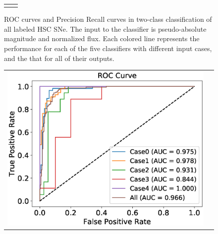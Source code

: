 \documentclass[useamsfonts]{pasj01}
\begin{document}
\begin{figure}[htbp]
\begin{tabular}{cc}
\begin{minipage}{0.5\hsize}
\begin{center}
            \end{center}
        \end{minipage}
    \end{tabular}
    \vspace{2mm}
    \caption{%
    ROC curves and Precision Recall curves in two-class classification of all labeled HSC SNe.
    The input to the classifier is pseudo-absolute magnitude and normalized flux.
    Each colored line represents the performance for each of the five classifiers with different input cases, and the that for all of their outputs.
    }
    \label{fig:h2_test_all}
\end{figure}
%
%
%
\begin{figure}[htbp]
    \begin{tabular}{cc}
        \begin{minipage}{0.5\hsize}
            \begin{center}
                \includegraphics[width=\columnwidth]{figures/10_absolute-magnitude-scaled-flux-remove-y_SNdata_test_190522_ROC_noedge_spec.eps}
            \end{center}
        \end{minipage}
        \begin{minipage}{0.5\hsize}
            \begin{center}

\end{center}
\end{minipage}
\end{tabular}
\end{figure}
\end{document}
